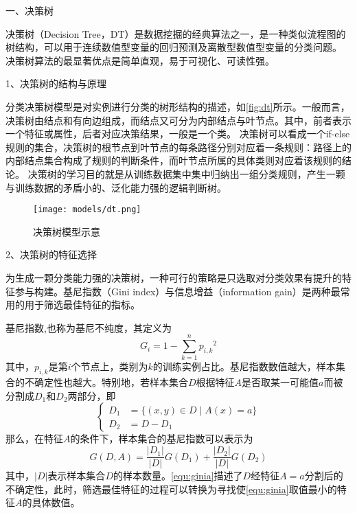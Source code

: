 一、决策树

决策树（Decision Tree，DT）是数据挖掘的经典算法之一，是一种类似流程图的树结构，可以用于连续数值型变量的回归预测及离散型数值型变量的分类问题\cite{Li2017,Liu2018}。
决策树算法的最显著优点是简单直观，易于可视化、可读性强。

1、决策树的结构与原理

分类决策树模型是对实例进行分类的树形结构的描述，如\autoref{fig:dt}所示。一般而言，决策树由结点和有向边组成，而结点又可分为内部结点与叶节点。其中，前者表示一个特征或属性，后者对应决策结果，一般是一个类\cite{Li2017,Zhou2016}。
决策树可以看成一个if-else规则的集合，决策树的根节点到叶节点的每条路径分别对应着一条规则：路径上的内部结点集合构成了规则的判断条件，而叶节点所属的具体类则对应着该规则的结论。
决策树的学习目的就是从训练数据集中集中归纳出一组分类规则，产生一颗与训练数据的矛盾小的、泛化能力强的逻辑判断树。
\begin{figure}[htbp]
      \centering
      \texttt{[image: models/dt.png]}
      \caption{\label{fig:dt}决策树模型示意}
\end{figure}

2、决策树的特征选择

为生成一颗分类能力强的决策树，一种可行的策略是只选取对分类效果有提升的特征参与构建。基尼指数（Gini index）与信息增益（information gain）是两种最常用的用于筛选最佳特征的指标。

基尼指数,也称为基尼不纯度，其定义为
\begin{equation}
      \label{equ:gini}
      G_i = 1 - \sum_{k=1}^n{p_{i,k}}^2
\end{equation}
其中，$p_{i,k}$是第$i$个节点上，类别为$k$的训练实例占比。基尼指数数值越大，样本集合的不确定性也越大。特别地，若样本集合$D$根据特征$A$是否取某一可能值$a$而被分割成$D_1$和$D_2$两部分，即
\begin{equation}
      \label{equ:daset}
      \left \{
      \begin{aligned}
            D_1 &= \{ (x,y) \in D \mid A(x) = a\} \\
            D_2 &= D - D_1
      \end{aligned}
      \right.
      \end{equation}
那么，在特征$A$的条件下，样本集合的基尼指数可以表示为
\begin{equation}
      \label{equ:ginia}
      G(D,A) = \frac{|D_1|}{|D|}G(D_1) + \frac{|D_2|}{|D|}G(D_2)
\end{equation}
其中，$|D|$表示样本集合$D$的样本数量。\autoref{equ:ginia}描述了$D$经特征$A=a$分割后的不确定性，此时，筛选最佳特征的过程可以转换为寻找使\autoref{equ:ginia}取值最小的特征$A$的具体数值。

